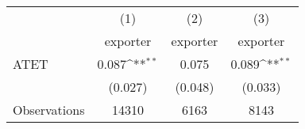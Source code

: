 {
\def\sym#1{\ifmmode^{#1}\else\(^{#1}\)\fi}
\begin{tabular}{l*{3}{c}}
\hline\hline
                    &\multicolumn{1}{c}{(1)}&\multicolumn{1}{c}{(2)}&\multicolumn{1}{c}{(3)}\\
                    &\multicolumn{1}{c}{exporter}&\multicolumn{1}{c}{exporter}&\multicolumn{1}{c}{exporter}\\
\hline
ATET                &       0.087\sym{**} &       0.075         &       0.089\sym{**} \\
                    &     (0.027)         &     (0.048)         &     (0.033)         \\
\hline
Observations        &       14310         &        6163         &        8143         \\
\hline\hline
\end{tabular}
}
